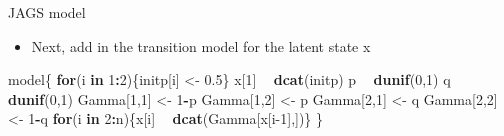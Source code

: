 \documentclass[
  ignorenonframetext,
]{beamer}
\newenvironment{Shaded}{\begin{snugshade}}{\end{snugshade}}
\newcommand{\ControlFlowTok}[1]{\textcolor[rgb]{0.13,0.29,0.53}{\textbf{#1}}}
\newcommand{\DecValTok}[1]{\textcolor[rgb]{0.00,0.00,0.81}{#1}}
\newcommand{\FloatTok}[1]{\textcolor[rgb]{0.00,0.00,0.81}{#1}}
\newcommand{\KeywordTok}[1]{\textcolor[rgb]{0.13,0.29,0.53}{\textbf{#1}}}
\newcommand{\NormalTok}[1]{#1}
\newcommand{\OperatorTok}[1]{\textcolor[rgb]{0.81,0.36,0.00}{\textbf{#1}}}
\newcommand{\StringTok}[1]{\textcolor[rgb]{0.31,0.60,0.02}{#1}}
\providecommand{\tightlist}{%
  \setlength{\itemsep}{0pt}\setlength{\parskip}{0pt}}
\begin{document}
\begin{frame}[fragile]{JAGS model}
\protect\hypertarget{jags-model-3}{}

\begin{itemize}
\tightlist
\item
  Next, add in the transition model for the latent state x
\end{itemize}

\begin{Shaded}
\begin{Highlighting}[]
\NormalTok{model\{}
\ControlFlowTok{for}\NormalTok{(i }\ControlFlowTok{in} \DecValTok{1}\OperatorTok{:}\DecValTok{2}\NormalTok{)\{initp[i] <-}\StringTok{ }\FloatTok{0.5}\NormalTok{\}}
\NormalTok{x[}\DecValTok{1}\NormalTok{] }\OperatorTok{~}\StringTok{ }\KeywordTok{dcat}\NormalTok{(initp)}
\NormalTok{p }\OperatorTok{~}\StringTok{ }\KeywordTok{dunif}\NormalTok{(}\DecValTok{0}\NormalTok{,}\DecValTok{1}\NormalTok{)}
\NormalTok{q }\OperatorTok{~}\StringTok{ }\KeywordTok{dunif}\NormalTok{(}\DecValTok{0}\NormalTok{,}\DecValTok{1}\NormalTok{)}
\NormalTok{Gamma[}\DecValTok{1}\NormalTok{,}\DecValTok{1}\NormalTok{] <-}\StringTok{ }\DecValTok{1}\OperatorTok{-}\NormalTok{p}
\NormalTok{Gamma[}\DecValTok{1}\NormalTok{,}\DecValTok{2}\NormalTok{] <-}\StringTok{ }\NormalTok{p}
\NormalTok{Gamma[}\DecValTok{2}\NormalTok{,}\DecValTok{1}\NormalTok{] <-}\StringTok{ }\NormalTok{q}
\NormalTok{Gamma[}\DecValTok{2}\NormalTok{,}\DecValTok{2}\NormalTok{] <-}\StringTok{ }\DecValTok{1}\OperatorTok{-}\NormalTok{q}
\ControlFlowTok{for}\NormalTok{(i }\ControlFlowTok{in} \DecValTok{2}\OperatorTok{:}\NormalTok{n)\{x[i] }\OperatorTok{~}\StringTok{ }\KeywordTok{dcat}\NormalTok{(Gamma[x[i}\DecValTok{-1}\NormalTok{],])\}}
\NormalTok{\}}
\end{Highlighting}
\end{Shaded}

\end{frame}
\end{document}
